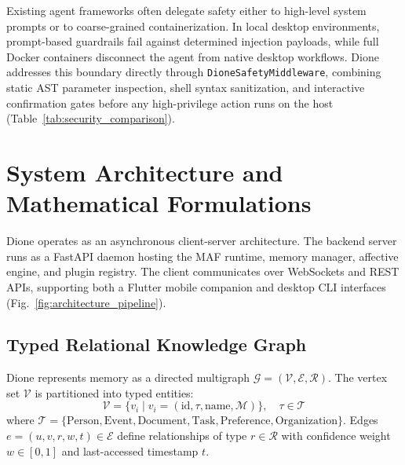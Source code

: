 \documentclass[conference,a4paper]{IEEEtran}
\begin{document}
Existing agent frameworks often delegate safety either to high-level system prompts or to coarse-grained containerization. In local desktop environments, prompt-based guardrails fail against determined injection payloads, while full Docker containers disconnect the agent from native desktop workflows. Dione addresses this boundary directly through \texttt{DioneSafetyMiddleware}, combining static AST parameter inspection, shell syntax sanitization, and interactive confirmation gates before any high-privilege action runs on the host (Table~\ref{tab:security_comparison}).

\section{System Architecture and Mathematical Formulations}

Dione operates as an asynchronous client-server architecture. The backend server runs as a FastAPI daemon hosting the MAF runtime, memory manager, affective engine, and plugin registry. The client communicates over WebSockets and REST APIs, supporting both a Flutter mobile companion and desktop CLI interfaces (Fig.~\ref{fig:architecture_pipeline}).

\subsection{Typed Relational Knowledge Graph}
Dione represents memory as a directed multigraph $\mathcal{G} = (\mathcal{V}, \mathcal{E}, \mathcal{R})$. The vertex set $\mathcal{V}$ is partitioned into typed entities:
\begin{equation}
\mathcal{V} = \{v_i \mid v_i = (\text{id}, \tau, \text{name}, \mathcal{M})\}, \quad \tau \in \mathcal{T}
\end{equation}
where $\mathcal{T} = \{\text{Person}, \text{Event}, \text{Document}, \text{Task}, \text{Preference}, \text{Organization}\}$. Edges $e = (u, v, r, w, t) \in \mathcal{E}$ define relationships of type $r \in \mathcal{R}$ with confidence weight $w \in [0, 1]$ and last-accessed timestamp $t$.
\end{document}
